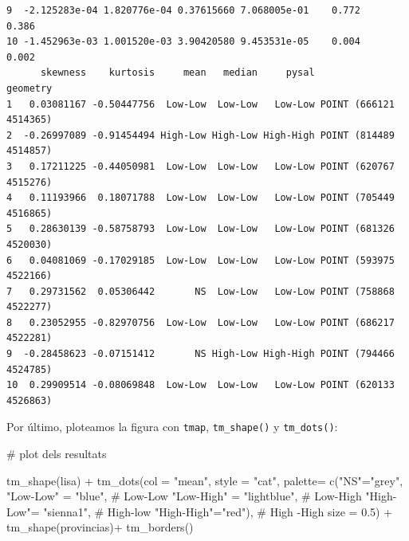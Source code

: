 \documentclass[
  letterpaper,
  DIV=11,
  numbers=noendperiod]{scrreprt}
\newenvironment{Shaded}{\begin{snugshade}}{\end{snugshade}}
\newcommand{\AttributeTok}[1]{\textcolor[rgb]{0.40,0.45,0.13}{#1}}
\newcommand{\CommentTok}[1]{\textcolor[rgb]{0.37,0.37,0.37}{#1}}
\newcommand{\FloatTok}[1]{\textcolor[rgb]{0.68,0.00,0.00}{#1}}
\newcommand{\FunctionTok}[1]{\textcolor[rgb]{0.28,0.35,0.67}{#1}}
\newcommand{\NormalTok}[1]{\textcolor[rgb]{0.00,0.23,0.31}{#1}}
\newcommand{\OtherTok}[1]{\textcolor[rgb]{0.00,0.23,0.31}{#1}}
\newcommand{\SpecialCharTok}[1]{\textcolor[rgb]{0.37,0.37,0.37}{#1}}
\newcommand{\StringTok}[1]{\textcolor[rgb]{0.13,0.47,0.30}{#1}}
\begin{document}
\begin{verbatim}
9  -2.125283e-04 1.820776e-04 0.37615660 7.068005e-01    0.772        0.386
10 -1.452963e-03 1.001520e-03 3.90420580 9.453531e-05    0.004        0.002
      skewness    kurtosis     mean   median     pysal               geometry
1   0.03081167 -0.50447756  Low-Low  Low-Low   Low-Low POINT (666121 4514365)
2  -0.26997089 -0.91454494 High-Low High-Low High-High POINT (814489 4514857)
3   0.17211225 -0.44050981  Low-Low  Low-Low   Low-Low POINT (620767 4515276)
4   0.11193966  0.18071788  Low-Low  Low-Low   Low-Low POINT (705449 4516865)
5   0.28630139 -0.58758793  Low-Low  Low-Low   Low-Low POINT (681326 4520030)
6   0.04081069 -0.17029185  Low-Low  Low-Low   Low-Low POINT (593975 4522166)
7   0.29731562  0.05306442       NS  Low-Low   Low-Low POINT (758868 4522277)
8   0.23052955 -0.82970756  Low-Low  Low-Low   Low-Low POINT (686217 4522281)
9  -0.28458623 -0.07151412       NS High-Low High-High POINT (794466 4524785)
10  0.29909514 -0.08069848  Low-Low  Low-Low   Low-Low POINT (620133 4526863)
\end{verbatim}

Por último, ploteamos la figura con \texttt{tmap}, \texttt{tm\_shape()}
y \texttt{tm\_dots()}:

\begin{Shaded}
\begin{Highlighting}[]
\CommentTok{\# plot dels resultats}

\FunctionTok{tm\_shape}\NormalTok{(lisa) }\SpecialCharTok{+}
    \FunctionTok{tm\_dots}\NormalTok{(}\AttributeTok{col =} \StringTok{"mean"}\NormalTok{,}
          \AttributeTok{style =} \StringTok{"cat"}\NormalTok{,}
          \AttributeTok{palette=} \FunctionTok{c}\NormalTok{(}\StringTok{"NS"}\OtherTok{=}\StringTok{"grey"}\NormalTok{,}
                     \StringTok{"Low{-}Low"} \OtherTok{=} \StringTok{"blue"}\NormalTok{,        }\CommentTok{\# Low{-}Low}
                     \StringTok{"Low{-}High"} \OtherTok{=} \StringTok{"lightblue"}\NormalTok{,  }\CommentTok{\# Low{-}High }
                     \StringTok{"High{-}Low"}\OtherTok{=} \StringTok{"sienna1"}\NormalTok{,     }\CommentTok{\# High{-}low}
                     \StringTok{"High{-}High"}\OtherTok{=}\StringTok{"red"}\NormalTok{),        }\CommentTok{\# High {-}High}
              \AttributeTok{size =} \FloatTok{0.5}\NormalTok{) }\SpecialCharTok{+}
\FunctionTok{tm\_shape}\NormalTok{(provincias)}\SpecialCharTok{+}
    \FunctionTok{tm\_borders}\NormalTok{()}
\end{Highlighting}
\end{Shaded}
\end{document}
